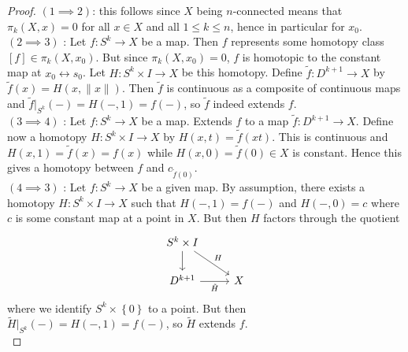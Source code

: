     \begin{proof}
        $\left( 1 \implies 2 \right) $: this follows since
        $X$ being $n$-connected means that $\pi_k\left( X,x \right) 
        = 0$ for all $x \in X$ and all $1\le k\le n$,
        hence in particular for $x_0$.\\
        $(2 \implies 3)$ : Let
        $f \colon S^{k} \to X$ be a map. 
        Then $f$ represents some homotopy class
        $\left[ f \right] \in \pi_k\left( X,x_0 \right) $. But
        since $\pi_k(X,x_0) = 0$, $f$ is homotopic to
        the constant map at $x_0 \rel s_0$.
        Let $H \colon S^{k} \times I \to X$ be this homotopy.
        Define
        $\tilde{f} \colon D^{k+1} \to X$ by
        $\tilde{f}(x) = H \left( x, \|x\| \right) $.
        Then $\tilde{f}$ is continuous as a composite of
        continuous maps and
        $\tilde{f}|_{S^{k}}(-) = 
        H\left( - , 1 \right) =
        f(-)$, so $\tilde{f}$ indeed extends $f$.\\
        $(3 \implies 4)$ : Let $f \colon S^{k} \to X$ be
        a map. Extends $f$ to a map
        $\tilde{f} \colon D^{k+1} \to X$. Define now
        a homotopy
        $H \colon S^{k} \times I \to X$ by
        $H\left( x,t \right) =
        \tilde{f}\left( xt \right) $. This is continuous
        and $H\left( x,1 \right) =
        \tilde{f}(x) = f(x)$ while
        $H\left( x,0 \right) = 
        \tilde{f}(0) \in X$ is constant. Hence this gives
        a homotopy between $f$ and $c_{\tilde{f}(0)}$.\\
        \linebreak
        $(4 \implies 3)$ : 
        Let $f \colon S^{k} \to X$ be a given map.
        By assumption, there exists
        a homotopy
        $H \colon S^{k} \times I \to X$ such that
        $H\left( -,1 \right) = f(-)$ and
        $H(-,0) = c$ where $c$ is some constant map
        at a point in $X$.
        But then $H$ factors through the quotient
        \begin{equation*}
        \begin{tikzcd}
            S^{k} \times I \ar[d] \ar[dr, "H"] & \\
            D^{k+1} \ar[r, "\tilde{H}"'] & X
        \end{tikzcd}
        \end{equation*}
        where we identify
        $S^{k} \times \left\{ 0 \right\} $ to a point.
        But then $\tilde{H}|_{S^{k}} (-) = 
        H\left( -, 1 \right) =
        f(-)$, so $\tilde{H}$ extends $f$.\\

\end{proof}

